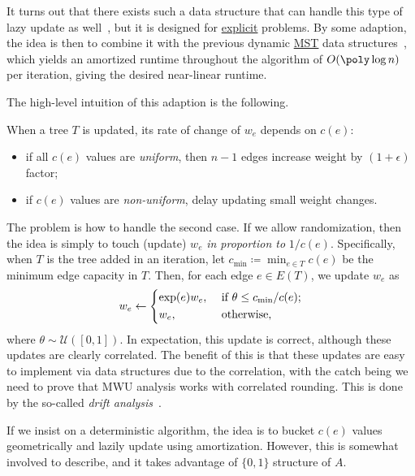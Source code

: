 It turns out that there exists such a data structure that can handle this type of lazy update as well~\cite{koufogiannakis2014nearly,young2014nearly}, but it is designed for \hyperref[def:explicit-LP]{explicit} problems. By some adaption, the idea is then to combine it with the previous dynamic \hyperref[prb:MST]{MST} data structures~\cite{holm2001poly}, which yields an amortized runtime throughout the algorithm of \(O(\poly \log n)\) per iteration, giving the desired near-linear runtime.

The high-level intuition of this adaption is the following.

\begin{intuition}
	When a tree \(T\) is updated, its rate of change of \(w_e\) depends on \(c(e)\):
	\begin{itemize}
		\item if all \(c(e)\) values are \emph{uniform}, then \(n-1\) edges increase weight by \((1 + \epsilon )\) factor;
		\item if \(c(e)\) values are \emph{non-uniform}, delay updating small weight changes.
	\end{itemize}
\end{intuition}

The problem is how to handle the second case. If we allow randomization, then the idea is simply to touch (update) \(w_e\) \emph{in proportion to} \(1 / c(e)\). Specifically, when \(T\) is the tree added in an iteration, let \(c_{\min } \coloneqq \min _{e \in T} c(e)\) be the minimum edge capacity in \(T\). Then, for each edge \(e \in E(T)\), we update \(w_e\) as
\[
	w_e \gets \begin{dcases}
		\exp (e) w_e , & \text{ if } \theta \leq c_{\min } / c(e) ; \\
		w_e,           & \text{ otherwise} ,
	\end{dcases}
\]
where \(\theta \sim \mathcal{U} ([0, 1])\). In expectation, this update is correct, although these updates are clearly correlated. The benefit of this is that these updates are easy to implement via data structures due to the correlation, with the catch being we need to prove that MWU analysis works with correlated rounding. This is done by the so-called \emph{drift analysis}~\cite{koufogiannakis2014nearly}.

\begin{remark}
	If we insist on a deterministic algorithm, the idea is to bucket \(c(e)\) values geometrically and lazily update using amortization. However, this is somewhat involved to describe, and it takes advantage of \(\{ 0, 1 \} \) structure of \(A\).
\end{remark}

